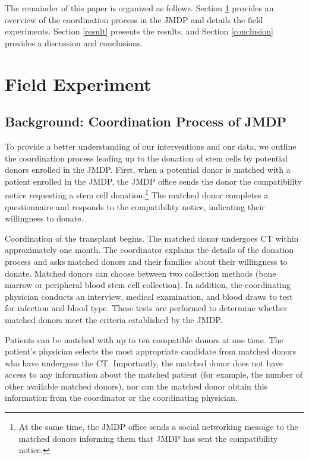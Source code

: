 \documentclass[12pt, a4paper]{article}
\begin{document}
The remainder of this paper is organized as follows. Section \ref{experiment} provides an overview of the coordination process in the JMDP and details the field experiments. Section \ref{result} presents the results, and Section \ref{conclusion} provides a discussion and conclusions.

\hypertarget{experiment}{%
\section{Field Experiment}\label{experiment}}

\hypertarget{background}{%
\subsection{Background: Coordination Process of JMDP}\label{background}}

To provide a better understanding of our interventions and our data, we outline the coordination process leading up to the donation of stem cells by potential donors enrolled in the JMDP. First, when a potential donor is matched with a patient enrolled in the JMDP, the JMDP office sends the donor the compatibility notice requesting a stem cell donation.\footnote{At the same time, the JMDP office sends a social networking message to the matched donors informing them that JMDP has sent the compatibility notice.} The matched donor completes a questionnaire and responds to the compatibility notice, indicating their willingness to donate.

Coordination of the transplant begins. The matched donor undergoes CT within approximately one month. The coordinator explains the details of the donation process and asks matched donors and their families about their willingness to donate. Matched donors can choose between two collection methods (bone marrow or peripheral blood stem cell collection). In addition, the coordinating physician conducts an interview, medical examination, and blood draws to test for infection and blood type. These tests are performed to determine whether matched donors meet the criteria established by the JMDP.

Patients can be matched with up to ten compatible donors at one time. The patient's physician selects the most appropriate candidate from matched donors who have undergone the CT. Importantly, the matched donor does not have access to any information about the matched patient (for example, the number of other available matched donors), nor can the matched donor obtain this information from the coordinator or the coordinating physician.
\end{document}
